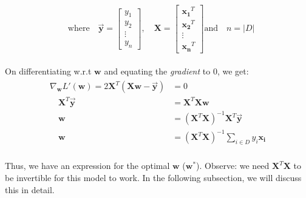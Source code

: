 \documentclass[12pt]{article}
\begin{document}
\begin{gather}
    \begin{aligned}
        & \text{where}  \quad \vec{\boldsymbol{y}} = \begin{bmatrix} y_1 \\ y_2 \\ \vdots \\ y_n\end{bmatrix} , \quad \boldsymbol{X} = \begin{bmatrix} \boldsymbol{x_1}^T \\ \boldsymbol{x_2}^T \\ \vdots \\ \boldsymbol{x_n}^T\end{bmatrix} \text{and} \quad n = |D| \nonumber
    \end{aligned}
\end{gather}

\noindent On differentiating w.r.t $\boldsymbol{w}$ and equating the \textit{gradient} to 0, we get:
\begin{gather}
    \begin{aligned}
        \nabla_{\boldsymbol{w}}L'(\boldsymbol{w}) = 2\boldsymbol{X}^T(\boldsymbol{X}\boldsymbol{w} - \vec{\boldsymbol{y}}) &= 0 \nonumber \\
        \quad \boldsymbol{X}^T\vec{\boldsymbol{y}} &= \boldsymbol{X}^T\boldsymbol{X}\boldsymbol{w}            \nonumber\\
        \quad \boldsymbol{w} &= (\boldsymbol{X}^T\boldsymbol{X})^{-1}\boldsymbol{X}^T\vec{\boldsymbol{y}}  \nonumber\\
        \quad \boldsymbol{w} &= (\boldsymbol{X}^T\boldsymbol{X})^{-1}\sum_{i \in D}y_i\boldsymbol{x_i}
    \end{aligned}
\end{gather}
\\
Thus, we have an expression for the optimal $\boldsymbol{w}$ ($\boldsymbol{w}^*$). Observe: we need $\boldsymbol{X}^T\boldsymbol{X}$ to be invertible for this model to work. In the following subsection, we will discuss this in detail.
\end{document}
